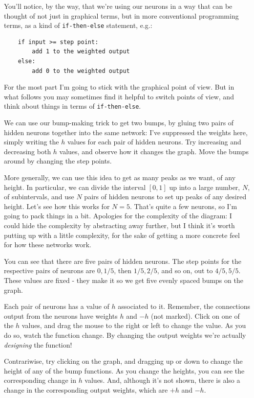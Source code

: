 You'll notice, by the way, that we're using our neurons in a way that can be thought of not just in graphical terms, but in more conventional programming terms, as a kind of \texttt{if-then-else} statement, e.g.:



\begin{lstlisting}
    if input >= step point:
        add 1 to the weighted output
    else:
        add 0 to the weighted output

\end{lstlisting}


For the most part I'm going to stick with the graphical point of view. But in what follows you may sometimes find it helpful to switch points of view, and think about things in terms of \texttt{if-then-else}.


We can use our bump-making trick to get two bumps, by gluing two pairs of hidden neurons together into the same network: I've suppressed the weights here, simply writing the $h$ values for each pair of hidden neurons. Try increasing and decreasing both $h$ values, and observe how it changes the graph. Move the bumps around by changing the step points.


More generally, we can use this idea to get as many peaks as we want, of any height. In particular, we can divide the interval $[0, 1]$ up into a large number, $N$, of subintervals, and use $N$ pairs of hidden neurons to set up peaks of any desired height. Let's see how this works for $N = 5$. That's quite a few neurons, so I'm going to pack things in a bit. Apologies for the complexity of the diagram: I could hide the complexity by abstracting away further, but I think it's worth putting up with a little complexity, for the sake of getting a more concrete feel for how these networks work.


You can see that there are five pairs of hidden neurons. The step points for the respective pairs of neurons are $0, 1/5$, then $1/5, 2/5$, and so on, out to $4/5, 5/5$. These values are fixed - they make it so we get five evenly spaced bumps on the graph.


Each pair of neurons has a value of $h$ associated to it. Remember, the connections output from the neurons have weights $h$ and $-h$ (not marked). Click on one of the $h$ values, and drag the mouse to the right or left to change the value. As you do so, watch the function change. By changing the output weights we're actually \emph{designing} the function!


Contrariwise, try clicking on the graph, and dragging up or down to change the height of any of the bump functions. As you change the heights, you can see the corresponding change in $h$ values. And, although it's not shown, there is also a change in the corresponding output weights, which are $+h$ and $-h$.


